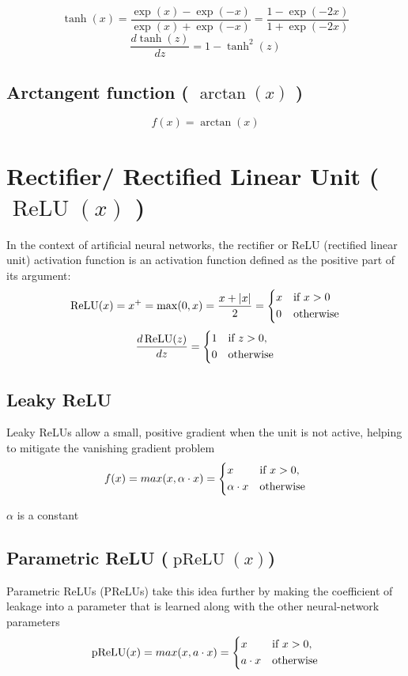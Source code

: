 \[
    \tanh(x)
    =\dfrac {\exp({x})-\exp({-x})}{\exp({x})+\exp({-x})} 
    = \frac{1 - \exp(-2x)}{1 + \exp(-2x)}
\]
\[
    \dfrac{d\tanh(z)}{dz} = 1-\tanh^2(z)
\]


\subsection{Arctangent function ( $\arctan(x)$ ) \cite{wiki-Inverse_trigonometric_functions}}
\[
    f(x)=\arctan(x)
\]


\section{Rectifier/ Rectified Linear Unit ( $\operatorname{ReLU}(x)$ ) \cite{wiki-Rectifier,dnn-1}}\label{ReLU}
In the context of artificial neural networks, the rectifier or ReLU (rectified linear unit) activation function is an activation function defined as the positive part of its argument:
\[
    \operatorname{ReLU}(x)=x^{+}=\max(0,x)={\dfrac {x+\left| x \right|}{2}}
    ={\begin{dcases}x&{\text{if }}x>0\\
    0&{\text{otherwise}}\end{dcases}}
\]
\[
    \dfrac{d\operatorname{ReLU}(z)}{dz}={\begin{dcases}1&{\text{if }}z>0,\\0&{\text{otherwise}}\end{dcases}}
\]

\subsection{Leaky ReLU \cite{wiki-Rectifier}}\label{Leaky ReLU}
Leaky ReLUs allow a small, positive gradient when the unit is not active, helping to mitigate the vanishing gradient problem
\[
    f(x)=max(x, \alpha\cdot x)={\begin{dcases}x&{\text{if }}x>0,\\\alpha\cdot x&{\text{otherwise}}\end{dcases}} 
\]

$\alpha$ is a constant

\subsection{Parametric ReLU ($\operatorname{pReLU}(x)$) \cite{wiki-Rectifier,dnn-1}} \label{Parametric ReLU (PReLU)}
Parametric ReLUs (PReLUs) take this idea further by making the coefficient of leakage into a parameter that is learned along with the other neural-network parameters
\[
    \operatorname{pReLU}(x)=max(x, a\cdot x)={\begin{dcases}x&{\text{if }}x>0,\\a\cdot x&{\text{otherwise}}\end{dcases}}
\]

